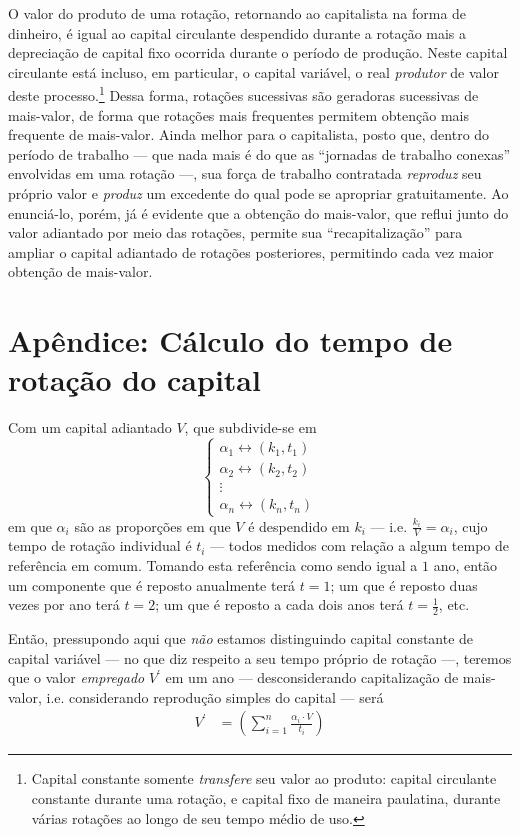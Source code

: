 \documentclass[12pt]{article}
\numberwithin{equation}{section}
\theoremstyle{plain}
\theoremstyle{definition}
\theoremstyle{remark}
\begin{document}
O valor do produto de uma rotação, retornando ao capitalista na forma de dinheiro, é igual ao capital circulante despendido durante a rotação mais a depreciação de capital fixo ocorrida durante o período de produção. Neste capital circulante está incluso, em particular, o capital variável, o real \textit{produtor} de valor deste processo.\footnote{Capital constante somente \textit{transfere} seu valor ao produto: capital circulante constante durante uma rotação, e capital fixo de maneira paulatina, durante várias rotações ao longo de seu tempo médio de uso.} Dessa forma, rotações sucessivas são geradoras sucessivas de mais-valor, de forma que rotações mais frequentes permitem obtenção mais frequente de mais-valor. Ainda melhor para o capitalista, posto que, dentro do período de trabalho — que nada mais é do que as ``jornadas de trabalho conexas'' envolvidas em uma rotação \parencite[p. 321]{Marx2014} —, sua força de trabalho contratada \textit{reproduz} seu próprio valor e \textit{produz} um excedente do qual pode se apropriar gratuitamente. Ao enunciá-lo, porém, já é evidente que a obtenção do mais-valor, que reflui junto do valor adiantado por meio das rotações, permite sua ``recapitalização'' para ampliar o capital adiantado de rotações posteriores, permitindo cada vez maior obtenção de mais-valor.



\section*{Apêndice: Cálculo do tempo de rotação do capital}
Com um capital adiantado $V$, que subdivide-se em
$$
\begin{cases}
\alpha_{1} \leftrightarrow  (k_{1}, t_{1}) \\
\alpha_{2} \leftrightarrow  (k_{2}, t_{2}) \\
\vdots \\
\alpha_{n} \leftrightarrow  (k_{n}, t_{n})
\end{cases}
$$
em que $\alpha_{i}$ são as proporções em que $V$ é despendido em $k_{i}$ — i.e. $\frac{k_{i}}{V} = \alpha_{i}$, cujo tempo de rotação individual é $t_{i}$ — todos medidos com relação a algum tempo de referência em comum. Tomando esta referência como sendo igual a $1$ ano, então um componente que é reposto anualmente terá $t=1$; um que é reposto duas vezes por ano terá $t=2$; um que é reposto a cada dois anos terá $t=\frac{1}{2}$, etc.

Então, pressupondo aqui que \textit{não} estamos distinguindo capital constante de capital variável — no que diz respeito a seu tempo próprio de rotação —, teremos que o valor \textit{empregado} $V^\prime$ em um ano — desconsiderando capitalização de mais-valor, i.e. considerando reprodução simples do capital — será
\begin{align*}
V^\prime &= \left( \sum \limits_{i=1}^{n} \frac{\alpha_{i} \cdot V}{t_{i}} \right)
\end{align*}
\end{document}
